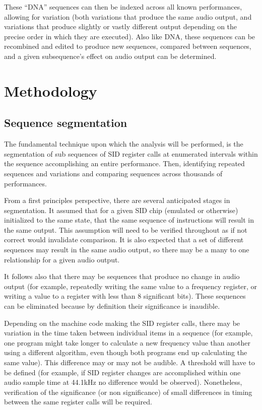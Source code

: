 \documentclass[10pt]{article}
\begin{document}
\begin{multicols*}{2}
  These ``DNA'' sequences can then be indexed across all known
  performances, allowing for variation (both variations that produce
  the same audio output, and variations that produce slightly or
  vastly different output depending on the precise order in which they
  are executed). Also like DNA, these sequences can be recombined and
  edited to produce new sequences, compared between sequences, and a
  given subsequence's effect on audio output can be determined.

  \section{Methodology}

  \subsection{Sequence segmentation}

  The fundamental technique upon which the analysis will be performed,
  is the segmentation of sub sequences of SID register calls at
  enumerated intervals within the sequence accomplishing an entire
  performance. Then, identifying repeated sequences and variations
  and comparing sequences across thousands of performances.

  From a first principles perspective, there are several anticipated
  stages in segmentation. It assumed that for a given SID chip
  (emulated or otherwise) initialized to the same state, that the same
  sequence of instructions will result in the same output. This
  assumption will need to be verified throughout as if not correct
  would invalidate comparison. It is also expected that a set of
  different sequences may result in the same audio output, so there
  may be a many to one relationship for a given audio output.

  It follows also that there may be sequences that produce no change
  in audio output (for example, repeatedly writing the same value to a
  frequency register, or writing a value to a register with less than 8
  significant bits). These sequences can be eliminated because by definition
  their significance is inaudible.

  Depending on the machine code making the SID register calls,
  there may be variation in the time taken between individual items in
  a sequence (for example, one program might take longer to calculate
  a new frequency value than another using a different algorithm, even
  though both programs end up calculating the same value). This
  difference may or may not be audible. A threshold will have to be
  defined (for example, if SID register changes are accomplished within
  one audio sample time at 44.1kHz no difference would be observed).
  Nonetheless, verification of the significance (or non significance)
  of small differences in timing between the same register calls
  will be required.


\end{multicols*}
\end{document}
